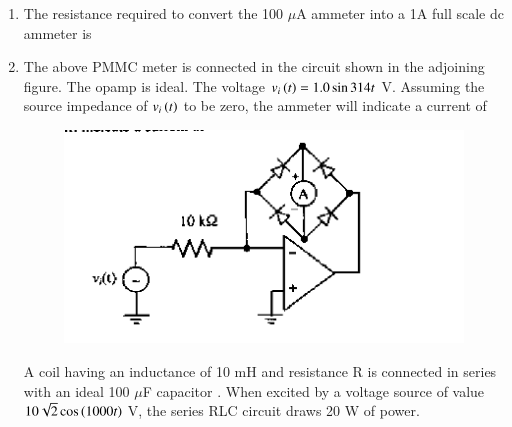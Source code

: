 \documentclass[journal,12pt,onecolumn]{IEEEtran}
\theoremstyle{remark}
\begin{document}
\begin{enumerate}
\item The resistance required to convert the 100 $\mu$A ammeter into a 1A full scale dc ammeter is

\hfill{}
\begin{enumerate} 
 \end{enumerate}

\item The above PMMC meter is connected in the circuit shown in the adjoining figure. The opamp is ideal. The voltage $v_i\left(t\right) = 1.0 \sin 314t$ V. Assuming the source impedance of $v_i\left(t\right)$ to be zero, the ammeter will indicate a current of
\begin{figure}[H]
    \centering
    \includegraphics[width = 0.7\columnwidth]{q51}
    \caption*{}
    \label{fig:Q51}
\end{figure}

\hfill{}\begin{enumerate}  \end{enumerate}

A coil having an inductance  of 10 mH and resistance R is connected in series with an ideal 100 $\mu$F capacitor . When excited by a voltage source of value $10\sqrt{2} \cos\left(1000t\right)$ V, the series RLC circuit draws 20 W of power.


\end{enumerate}
\end{document}

